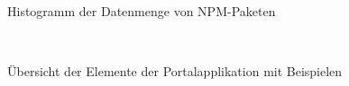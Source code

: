 \begin{figure}[hbt!]
	\centering
	\begin{minipage}[t]{1\textwidth}	
		\caption{Histogramm der Datenmenge von NPM-Paketen}
		\\ %
		\label{fig:HistogrammDatenmenge}
	\end{minipage}
\end{figure}

\newpage
\begin{figure}[hbt!]
	\centering
	\begin{minipage}[t]{1\textwidth}	
		\caption{Übersicht der Elemente der Portalapplikation mit Beispielen}
		\\ %
		\label{fig:PortalapplikationElementeKonkret}
	\end{minipage}
\end{figure}

